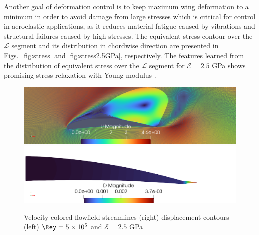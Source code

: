 Another goal of deformation control is to keep maximum wing deformation to a minimum in order to avoid damage from large stresses which is critical for control in aeroelastic applications, as it reduces material fatigue caused by vibrations and structural failures caused by high stresses.
%
The equivalent stress contour over the $\mathcal{L}$ segment and its distribution in chordwise direction are presented in Figs.~\ref{fig:stress} and \ref{fig:stress2.5GPa}, respectively.
%
The features learned from the distribution of equivalent stress over the $\mathcal{L}$ segment for $\mathcal{E}=2.5$ GPa shows promising stress relaxation with Young modulus .


%
%
\begin{figure}[ht!]
\centering
\includegraphics[width=0.45\columnwidth]{Figures/streamLines25GPACoupling.png}
\includegraphics[width=0.45\columnwidth]{Figures/DMAgnitude25GPaCoupling.png}
\caption{Velocity colored flowfield streamlines (right) displacement contours (left) $\Rey=5\times10^5$ and $\mathcal{E}=2.5$ GPa}
\label{fig:25GPA}
\end{figure}

